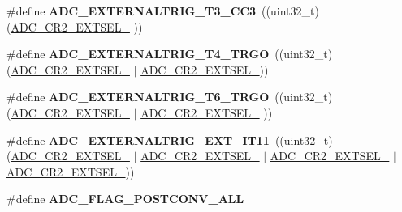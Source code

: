 \begin{DoxyCompactItemize}
\item 
\hypertarget{group___a_d_c___private___constants_ga6abd3b4e0abcb3edbd159e980e30d9d6}{\#define {\bfseries A\-D\-C\-\_\-\-E\-X\-T\-E\-R\-N\-A\-L\-T\-R\-I\-G\-\_\-\-T3\-\_\-\-C\-C3}~((uint32\-\_\-t)(\hyperlink{group___peripheral___registers___bits___definition_ga387de6160834197888efa43e164c2db9}{A\-D\-C\-\_\-\-C\-R2\-\_\-\-E\-X\-T\-S\-E\-L\-\_}                                                         ))}\label{group___a_d_c___private___constants_ga6abd3b4e0abcb3edbd159e980e30d9d6}

\item 
\hypertarget{group___a_d_c___private___constants_gacbde6cb476c93a74fa2203884af33c06}{\#define {\bfseries A\-D\-C\-\_\-\-E\-X\-T\-E\-R\-N\-A\-L\-T\-R\-I\-G\-\_\-\-T4\-\_\-\-T\-R\-G\-O}~((uint32\-\_\-t)(\hyperlink{group___peripheral___registers___bits___definition_ga387de6160834197888efa43e164c2db9}{A\-D\-C\-\_\-\-C\-R2\-\_\-\-E\-X\-T\-S\-E\-L\-\_}                                       $\vert$ \hyperlink{group___peripheral___registers___bits___definition_ga9410c7fd93f6d0b157ede745ee269d7b}{A\-D\-C\-\_\-\-C\-R2\-\_\-\-E\-X\-T\-S\-E\-L\-\_}))}\label{group___a_d_c___private___constants_gacbde6cb476c93a74fa2203884af33c06}

\item 
\hypertarget{group___a_d_c___private___constants_ga8494b127c514467b790fef9d5be6f2ac}{\#define {\bfseries A\-D\-C\-\_\-\-E\-X\-T\-E\-R\-N\-A\-L\-T\-R\-I\-G\-\_\-\-T6\-\_\-\-T\-R\-G\-O}~((uint32\-\_\-t)(\hyperlink{group___peripheral___registers___bits___definition_ga387de6160834197888efa43e164c2db9}{A\-D\-C\-\_\-\-C\-R2\-\_\-\-E\-X\-T\-S\-E\-L\-\_}                    $\vert$ \hyperlink{group___peripheral___registers___bits___definition_ga5a6725419743a8d01b4a223609952893}{A\-D\-C\-\_\-\-C\-R2\-\_\-\-E\-X\-T\-S\-E\-L\-\_}                   ))}\label{group___a_d_c___private___constants_ga8494b127c514467b790fef9d5be6f2ac}

\item 
\hypertarget{group___a_d_c___private___constants_ga79c6ddcd5e158a6506da9fae010927d8}{\#define {\bfseries A\-D\-C\-\_\-\-E\-X\-T\-E\-R\-N\-A\-L\-T\-R\-I\-G\-\_\-\-E\-X\-T\-\_\-\-I\-T11}~((uint32\-\_\-t)(\hyperlink{group___peripheral___registers___bits___definition_ga387de6160834197888efa43e164c2db9}{A\-D\-C\-\_\-\-C\-R2\-\_\-\-E\-X\-T\-S\-E\-L\-\_} $\vert$ \hyperlink{group___peripheral___registers___bits___definition_ga5c2322988b5fff19d012d9179d412ad0}{A\-D\-C\-\_\-\-C\-R2\-\_\-\-E\-X\-T\-S\-E\-L\-\_} $\vert$ \hyperlink{group___peripheral___registers___bits___definition_ga5a6725419743a8d01b4a223609952893}{A\-D\-C\-\_\-\-C\-R2\-\_\-\-E\-X\-T\-S\-E\-L\-\_} $\vert$ \hyperlink{group___peripheral___registers___bits___definition_ga9410c7fd93f6d0b157ede745ee269d7b}{A\-D\-C\-\_\-\-C\-R2\-\_\-\-E\-X\-T\-S\-E\-L\-\_}))}\label{group___a_d_c___private___constants_ga79c6ddcd5e158a6506da9fae010927d8}

\item 
\#define {\bfseries A\-D\-C\-\_\-\-F\-L\-A\-G\-\_\-\-P\-O\-S\-T\-C\-O\-N\-V\-\_\-\-A\-L\-L}
\end{DoxyCompactItemize}


